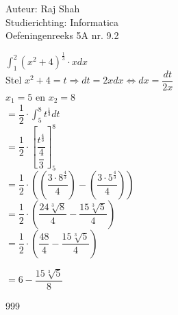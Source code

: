 \documentclass[a4paper]{article}
\begin{document}
  
\noindent \large Auteur: Raj Shah \\
\noindent \large Studierichting: Informatica\\
\noindent \large Oefeningenreeks 5A nr. 9.2 \\

\medskip

\normalsize

$\displaystyle\int_{1}^{2} (x^2 + 4)^\tfrac{1}{3}\cdot x dx$\\

Stel $x^2 + 4 = t \Rightarrow dt = 2xdx \Leftrightarrow dx = \dfrac{dt}{2x}$\\

$x_1 = 5$ en $x_2 = 8$\\

$ = \dfrac{1}{2} \cdot \displaystyle\int_{5}^{8} t^{\tfrac{1}{3}} dt$\\

$ = \dfrac{1}{2} \cdot \left[\dfrac{t^{\tfrac{4}{3}}}{{\dfrac{4}{3}}}\right]_{5}^{8}$\\

$ = \dfrac{1}{2} \cdot \left(\left(\dfrac{3\cdot 8^{\tfrac{4}{3}}}{4}\right) - \left(\dfrac{3\cdot 5^{\tfrac{4}{3}}}{4}\right)\right)$\\

$ = \dfrac{1}{2} \cdot \left(\dfrac{24\sqrt[3]{8}}{4} - \dfrac{15\sqrt[3]{5}}{4}\right)$\\

$ = \dfrac{1}{2} \cdot \left(\dfrac{48}{4} - \dfrac{15\sqrt[3]{5}}{4}\right)$

$ = 6 - \dfrac{15\sqrt[3]{5}}{8}$


\begin{thebibliography}{999}
\end{thebibliography}
\end{document}
